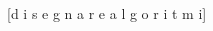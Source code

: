 \documentclass[10pt, a4paper, twoside]{book}
\begin{document}
\begin{multicols}{2}

[d i s e g n a r e  a l g o r i t m i]
\end{multicols}

\clearpage

%
%
%
%
%
%

%
%
%
%
%
%
%
%
%
%

\clearpage



\clearpage
\end{document}
